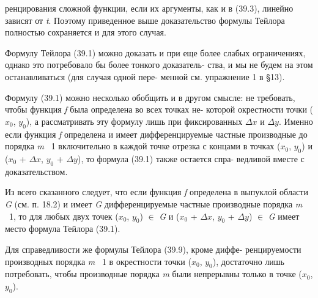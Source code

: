 \documentclass[10pt]{book}
\begin{document}
	\begin{spacing}{0.85}
	   \noindent ренцирования сложной функции, если их аргументы, как и в (39.3), \linebreak
	   линейно зависят от \textit {t}. Поэтому приведенное выше доказательство \linebreak
	   формулы Тейлора полностью сохраняется и для этого случая.
	   
	   Формулу Тейлора (39.1) можно доказать и при еще более слабых \linebreak
	   ограничениях, однако это потребовало бы более тонкого доказатель-\linebreak
	   ства, и мы не будем на этом останавливаться (для случая одной пере-\linebreak
	   менной см. упражнение 1 в \S 13).
	 
	   Формулу (39.1) можно несколько обобщить и в другом смысле: \linebreak
	   не требовать, чтобы функция \textit {f} была определена во всех точках не- \linebreak
	   которой окрестности точки ($x_0$, $y_0$), а рассматривать эту формулу \linebreak
	   лишь при фиксированных $\Delta x$ и $\Delta y$. Именно если функция \textit {f} определена и имеет дифференцируемые частные производные до порядка \linebreak
	   \textit {m} \textemdash~1 включительно в каждой точке отрезка с концами в точках \linebreak
	   ($x_0$, $y_0$) и ($x_0$ +  $\Delta x$, $y_0$ + $\Delta y$), то формула (39.1) также остается спра-
	    \linebreak ведливой вместе с доказательством.
	   
	   Из всего сказанного следует, что если функция \textit {f} определена в выпуклой области \textit {G} (см. п. 18.2) и имеет \textit{G} дифференцируемые частные производные порядка \textit {m} \textemdash~1, то для любых двух точек ($x_0$, $y_0$) $\in$ \textit {G} \linebreak
	   и ($x_0$ +  $\Delta x$, $y_0$ + $\Delta y$) $\in$ \textit{G} имеет место формула Тейлора (39.1).
	   
	   Для справедливости же формулы Тейлора (39.9), кроме диффе- \linebreak
	   ренцируемости производных порядка \textit {m} \textemdash~1 в окрестности точки \linebreak
	   ($x_0$, $y_0$), достаточно лишь потребовать, чтобы производные порядка \textit {m}
	   были непрерывны только в точке ($x_0$, $y_0$).
	   

\end{spacing}
\end{document}

